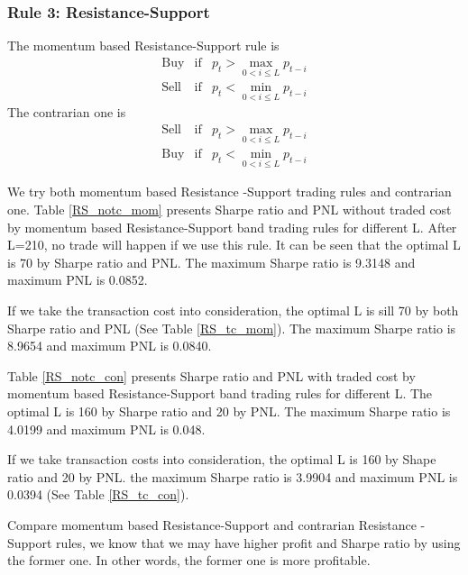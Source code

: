 \documentclass[11pt]{article}
\begin{document}
\subsubsection{Rule 3: Resistance-Support}
The momentum based Resistance-Support rule is
\begin{eqnarray*}
\text{Buy}& \text{if}& p_t>\max_{0<i\leq L} p_{t-i}\\
\text{Sell}& \text{if}& p_t<\min_{0<i\leq L} p_{t-i}
\end{eqnarray*}
The contrarian one is
\begin{eqnarray*}
\text{Sell}& \text{if}& p_t>\max_{0<i\leq L} p_{t-i}\\
\text{Buy}& \text{if}& p_t<\min_{0<i\leq L} p_{t-i}
\end{eqnarray*}

We try both momentum based Resistance -Support trading rules and contrarian one. Table \ref{RS_notc_mom} presents Sharpe ratio and PNL without traded cost by momentum based Resistance-Support band trading rules for different L. After L=210, no trade will happen if we use this rule. It can be seen that the optimal L is 70 by Sharpe ratio and PNL. The maximum Sharpe ratio is 9.3148 and maximum PNL is 0.0852.

If we take the transaction cost into consideration, the optimal L is sill 70 by both Sharpe ratio and PNL (See Table \ref{RS_tc_mom}). The maximum Sharpe ratio is 8.9654 and maximum PNL is 0.0840.

Table \ref{RS_notc_con} presents Sharpe ratio and PNL with traded cost by momentum based Resistance-Support band trading rules for different L. The optimal L is 160 by Sharpe ratio and 20 by PNL. The maximum Sharpe ratio is 4.0199 and maximum PNL is 0.048. 

If we take transaction costs into consideration, the optimal L is 160 by Shape ratio and 20 by PNL. the maximum Sharpe ratio is 3.9904 and maximum PNL is 0.0394 (See Table \ref{RS_tc_con}).

Compare momentum based Resistance-Support and contrarian Resistance -Support rules, we know that we may have higher profit and Sharpe ratio by using the former one. In other words, the former one is more profitable.
\end{document}
